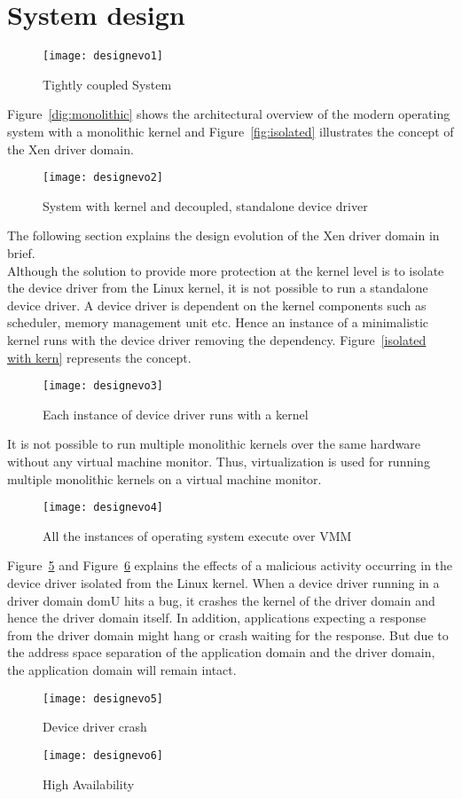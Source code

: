 \section{System design}\label{design}
\begin{figure}[!ht]
\centering
\texttt{[image: designevo1]}
\caption{Tightly coupled System}
\label{fig:monolithic}
\end{figure}
Figure~\ref{dig:monolithic} shows the architectural overview of the modern operating system with a monolithic kernel and Figure~\ref{fig:isolated} illustrates the concept of the Xen driver domain.
\begin{figure}[!ht]
\centering
\texttt{[image: designevo2]}
\caption{System with kernel and decoupled, standalone device driver}
\label{fig:isolted}
\end{figure}

The following section explains the design evolution of the Xen driver domain in brief. 
\\
Although the solution to provide more protection at the kernel level is to isolate the device driver from the Linux kernel, it is not possible to run a standalone device driver. A device driver is dependent on the kernel components such as scheduler, memory management unit etc. Hence an instance of a minimalistic kernel runs with the device driver removing the dependency. Figure~\ref{isolated with kern} represents the concept. 
\begin{figure}[!ht]
\centering
\texttt{[image: designevo3]}
\caption{Each instance of device driver runs with a kernel}
\label{fig:isolated with kern}
\end{figure}
It is not possible to run multiple monolithic kernels over the same hardware without any virtual machine monitor. Thus, virtualization is used for running multiple monolithic kernels on a virtual machine monitor.
\begin{figure}[!ht]
\centering
\texttt{[image: designevo4]}
\caption{All the instances of operating system execute over VMM}
\label{fig:final}
\end{figure}
Figure~\ref{fig:driver crash} and Figure~\ref{fig:high avail} explains the effects of a malicious activity occurring in the device driver isolated from the Linux kernel. When a device driver running in a driver domain domU hits a bug, it crashes the kernel of the driver domain and hence the driver domain itself. In addition, applications expecting a response from the driver domain might hang or crash waiting for the response. But due to the address space separation of the application domain and the driver domain, the application domain will remain intact.   
\begin{figure}[!ht]
\centering
\texttt{[image: designevo5]}
\caption{Device driver crash}
\label{fig:driver crash}
\end{figure}
\begin{figure}[!ht]
\centering
\texttt{[image: designevo6]}
\caption{High Availability}
\label{fig:high avail}
\end{figure}
\pagebreak
    
